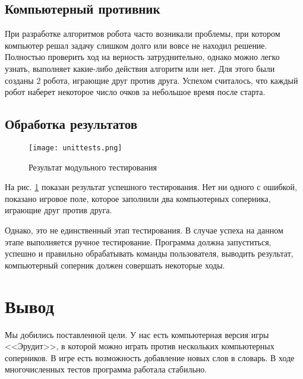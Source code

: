 \documentclass[a4paper,14pt]{article}
\begin{document}
	\subsection{Компьютерный противник}
	При разработке алгоритмов робота часто возникали проблемы, при котором компьютер решал задачу слишком долго или вовсе не находил решение. Полностью проверить ход на верность затруднительно, однако можно легко узнать, выполняет какие-либо действия алгоритм или нет. Для этого были созданы 2 робота, играющие друг против друга. Успехом считалось, что каждый робот наберет некоторое число очков за небольшое время после старта.
	
	\subsection{Обработка результатов}
	\begin{figure}[bhtp]
		\centering		
		\texttt{[image: unittests.png]}
		\caption{Результат модульного тестирования}\label{img:tests}
	\end{figure}
	
	На рис. \ref{img:tests} показан результат успешного тестирования. Нет ни одного с ошибкой, показано игровое поле, которое заполнили два компьютерных соперника, играющие друг против друга.
	
	Однако, это не единственный этап тестирования. В случае успеха на данном этапе выполняется ручное тестирование. Программа должна запуститься, успешно и правильно обрабатывать команды пользователя, выводить результат, компьютерный соперник должен совершать некоторые ходы.
	
\section{Вывод}
	Мы добились поставленной цели. У нас есть компьютерная версия игры <<Эрудит>>, в которой можно играть против нескольких компьютерных соперников. В игре есть возможность добавление новых слов в словарь. В ходе многочисленных тестов программа работала стабильно.
\end{document}
